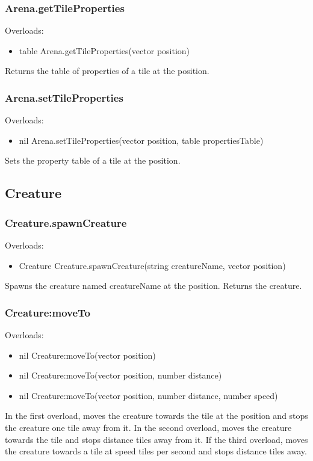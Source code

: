 \documentclass{book}
\newenvironment{ulist}
	{\begin{itemize}
			\itemsep0em}
	{\end{itemize}}
\begin{document}
\subsubsection{Arena.getTileProperties}
Overloads:
\begin{ulist}
	\item table Arena.getTileProperties(vector position)
\end{ulist}
Returns the table of properties of a tile at the position.

\subsubsection{Arena.setTileProperties}
Overloads:
\begin{ulist}
	\item nil Arena.setTileProperties(vector position, table propertiesTable)
\end{ulist}
Sets the property table of a tile at the position.

\subsection{Creature}
\subsubsection{Creature.spawnCreature}
Overloads:
\begin{ulist}
	\item Creature Creature.spawnCreature(string creatureName, vector position)
\end{ulist}
Spawns the creature named creatureName at the position. Returns the creature.

\subsubsection{Creature:moveTo}
Overloads:
\begin{ulist}
	\item nil Creature:moveTo(vector position)
	\item nil Creature:moveTo(vector position, number distance)
	\item nil Creature:moveTo(vector position, number distance, number speed)
\end{ulist}
In the first overload, moves the creature towards the tile at the position and stops the creature one tile away from it. In the second overload, moves the creature towards the tile and stops distance tiles away from it. If the third overload, moves the creature towards a tile at speed tiles per second and stops distance tiles away.
\end{document}
